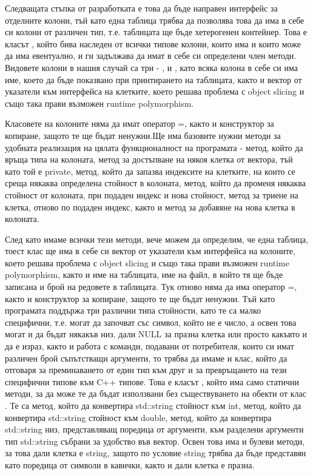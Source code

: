 Следващата стъпка от разработката е това да бъде направен интерфейс за отделните колони, тъй като една таблица трябва да позволява това да има в себе си колони от различен тип, т.\+е. таблицата ще бъде хетерогенен контейнер. Това е класът , който бива наследен от всички типове колони, които има и които може да има евентуално, и ги задължава да имат в себе си определени член методи. Видовете колони в нашия случай са три -\/ ,  и , като всяка колона в себе си има име, което да бъде показвано при принтирането на таблицата, както и вектор от указатели към интерфейса на клетките, което решава проблема с object slicing и също така прави възможен runtime polymorphism.

Класовете на колоните няма да имат оператор =, както и конструктор за копиране, защото те ще бъдат ненужни.\+Ще има базовите нужни методи за удобната реализация на цялата функционалност на програмата -\/ метод, който да връща типа на колоната, метод за достъпване на някоя клетка от вектора, тъй като той е private, метод, който да запазва индексите на клетките, на които се среща някаква определена стойност в колоната, метод, който да променя някаква стойност от колоната, при подаден индекс и нова стойност, метод за триене на клетка, отново по подаден индекс, както и метод за добавяне на нова клетка в колоната.

След като имаме всички тези методи, вече можем да определим, че една таблица, тоест клас  ще има в себе си вектор от указатели към интерфейса на колоните, което решава проблема с object slicing и също така прави възможен runtime polymorphism, както и име на таблицата, име на файл, в който тя ще бъде записана и брой на редовете в таблицата. Тук отново няма да има оператор =, както и конструктор за копиране, защото те ще бъдат ненужни. Тъй като програмата поддържа три различни типа стойности, като те са малко специфични, т.\+е. могат да започват със символ, който не е число, а освен това могат и да бъдат някакъв низ, дали NULL за празна клетка или просто какъвто и да е израз, както и работа с команди, подавани от потребителя, които си имат различен брой съпътстващи аргументи, то трябва да имаме и клас, който да отговаря за преминаването от един тип към друг и за превръщането на тези специфични типове към C++ типове. Това е класът , който има само статични методи, за да може те да бъдат използвани без съществуването на обекти от клас . Те са метод, който да конвертира std\+::string стойност към int, метод, който да конвертира std\+::string стойност към double, метод, който да конвертира std\+::string низ, представляващ поредица от аргументи, към разделени аргументи тип std\+::string събрани за удобство във вектор. Освен това  има и булеви методи, за това дали клетка е string, защото по условие string трябва да бъде представян като поредица от символи в кавички, както и дали клетка е празна.

